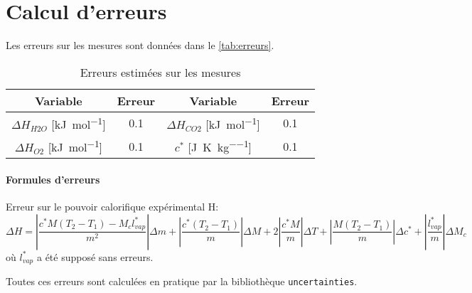 \section{Calcul d'erreurs}
\label{sec:erreurs}

Les erreurs sur les mesures sont données dans le \autoref{tab:erreurs}.

\begin{table}[h]
    \centering
    \begin{tabulary}{\textwidth}{C C|C C}
        \toprule
        Variable & Erreur & Variable & Erreur \\
        \midrule
        \(\Delta H_{H2O}\) [\si{\kilo\joule\per\mole}] & 0.1 & \(\Delta H_{CO2}\) [\si{\kilo\joule\per\mole}] & 0.1 \\
        \(\Delta H_{O2}\) [\si{\kilo\joule\per\mole}] & 0.1 & \(c^*\) [\si{\joule\per\kelvin\per\kilo\gram}] & 0.1 \\
        \bottomrule
    \end{tabulary}
    \caption{Erreurs estimées sur les mesures}
    \label{tab:erreurs}
\end{table}


\paragraph*{Formules d'erreurs}

Erreur sur le pouvoir calorifique expérimental H:
\begin{equation}
    \Delta H = \left|\frac{c^* M (T_2 - T_1) - M_c l^*_{vap}}{m^2}\right| \Delta m + \left|\frac{c^* (T_2 - T_1)}{m}\right| \Delta M + 2 \left|\frac{c^* M}{m}\right| \Delta T + \left|\frac{M (T_2 - T_1)}{m}\right| \Delta c^* + \left|\frac{l^*_{vap}}{m}\right| \Delta M_c
\end{equation}
où \(l^*_{vap}\) a été supposé sans erreurs.

Toutes ces erreurs sont calculées en pratique par la bibliothèque \texttt{uncertainties}.
